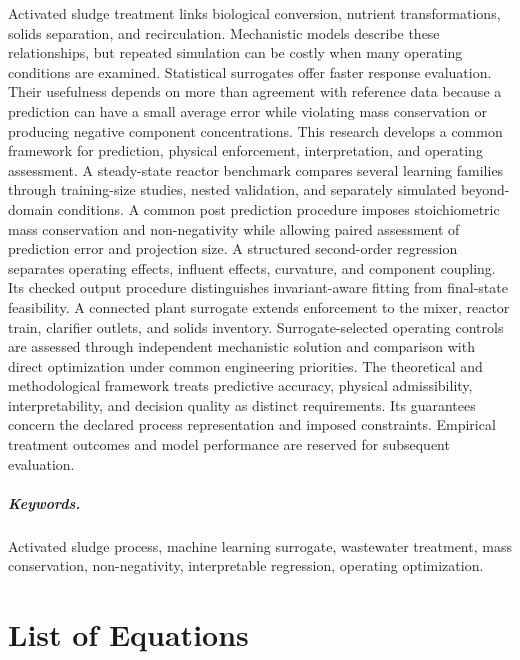 \documentclass[12pt,twoside]{book}
\makeatletter
\newcommand{\listofequations}{%
    \chapter*{List of Equations}%
    \addcontentsline{toc}{chapter}{List of Equations}%
    \@starttoc{loe}%
}
\makeatother
\begin{document}
Activated sludge treatment links biological conversion, nutrient transformations, solids separation, and recirculation. Mechanistic models describe these relationships, but repeated simulation can be costly when many operating conditions are examined. Statistical surrogates offer faster response evaluation. Their usefulness depends on more than agreement with reference data because a prediction can have a small average error while violating mass conservation or producing negative component concentrations. This research develops a common framework for prediction, physical enforcement, interpretation, and operating assessment. A steady-state reactor benchmark compares several learning families through training-size studies, nested validation, and separately simulated beyond-domain conditions. A common post prediction procedure imposes stoichiometric mass conservation and non-negativity while allowing paired assessment of prediction error and projection size. A structured second-order regression separates operating effects, influent effects, curvature, and component coupling. Its checked output procedure distinguishes invariant-aware fitting from final-state feasibility. A connected plant surrogate extends enforcement to the mixer, reactor train, clarifier outlets, and solids inventory. Surrogate-selected operating controls are assessed through independent mechanistic solution and comparison with direct optimization under common engineering priorities. The theoretical and methodological framework treats predictive accuracy, physical admissibility, interpretability, and decision quality as distinct requirements. Its guarantees concern the declared process representation and imposed constraints. Empirical treatment outcomes and model performance are reserved for subsequent evaluation.

\paragraph*{Keywords.} Activated sludge process, machine learning surrogate, wastewater treatment, mass conservation, non-negativity, interpretable regression, operating optimization.

\cleardoublepage
\tableofcontents
\cleardoublepage
\listoffigures
\cleardoublepage
\listoftables

\cleardoublepage
\listofequations

\cleardoublepage
\end{document}
